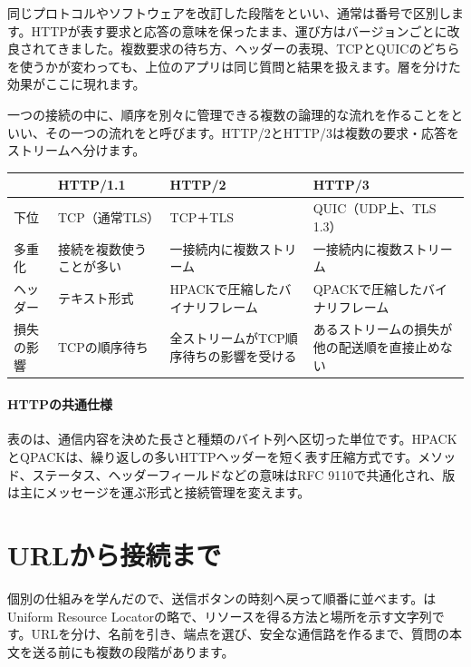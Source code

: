 同じプロトコルやソフトウェアを改訂した段階をといい、通常は番号で区別します。HTTPが表す要求と応答の意味を保ったまま、運び方はバージョンごとに改良されてきました。複数要求の待ち方、ヘッダーの表現、TCPとQUICのどちらを使うかが変わっても、上位のアプリは同じ質問と結果を扱えます。層を分けた効果がここに現れます。

一つの接続の中に、順序を別々に管理できる複数の論理的な流れを作ることをといい、その一つの流れをと呼びます。HTTP/2とHTTP/3は複数の要求・応答をストリームへ分けます。

\begingroup
  \noindent
  \begin{tabularx}{\textwidth}{@{}lYYY@{}}
    \toprule
    & HTTP/1.1 & HTTP/2 & HTTP/3\\
    \midrule
    下位 & TCP（通常TLS） & TCP＋TLS & QUIC（UDP上、TLS 1.3）\\
    多重化 & 接続を複数使うことが多い & 一接続内に複数ストリーム & 一接続内に複数ストリーム\\
    ヘッダー & テキスト形式 & HPACKで圧縮したバイナリフレーム & QPACKで圧縮したバイナリフレーム\\
    損失の影響 & TCPの順序待ち & 全ストリームがTCP順序待ちの影響を受ける & あるストリームの損失が他の配送順を直接止めない\\
    \bottomrule
  \end{tabularx}
  \vspace{4mm}
\paragraph{HTTPの共通仕様}
    表のは、通信内容を決めた長さと種類のバイト列へ区切った単位です。HPACKとQPACKは、繰り返しの多いHTTPヘッダーを短く表す圧縮方式です。メソッド、ステータス、ヘッダーフィールドなどの意味はRFC 9110で共通化され、版は主にメッセージを運ぶ形式と接続管理を変えます。

\par
\endgroup


\section{URLから接続まで}
\label{sec:05-network-19}

個別の仕組みを学んだので、送信ボタンの時刻へ戻って順番に並べます。はUniform Resource Locatorの略で、リソースを得る方法と場所を示す文字列です。URLを分け、名前を引き、端点を選び、安全な通信路を作るまで、質問の本文を送る前にも複数の段階があります。

